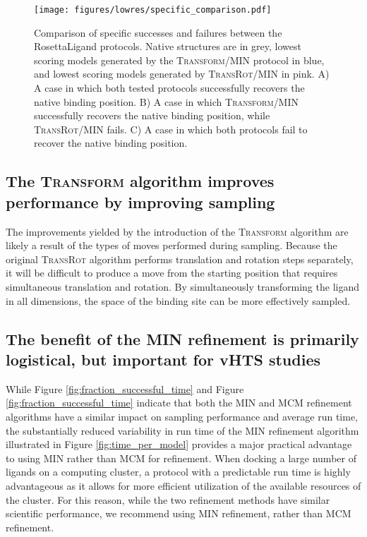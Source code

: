 \begin{figure}
\centering
\texttt{[image: figures/lowres/specific\_comparison.pdf]}
\caption{
Comparison of specific successes and failures between the RosettaLigand protocols.
Native structures are in grey, lowest scoring models generated by the \textsc{Transform}/MIN protocol in blue, and lowest scoring models generated by \textsc{TransRot}/MIN in pink.
A) A case in which both tested protocols successfully recovers the native binding position.
B) A case in which \textsc{Transform}/MIN successfully recovers the native binding position, while \textsc{TransRot}/MIN fails.
C) A case in which both protocols fail to recover the native binding position. 
}
\label{fig:specific_comparison}
\end{figure}

\subsection{The \textsc{Transform} algorithm improves performance by improving sampling}
The improvements yielded by the introduction of the \textsc{Transform} algorithm are likely a result of the types of moves performed during sampling.
Because the original \textsc{TransRot} algorithm performs translation and rotation steps separately, it will be difficult to produce a move from the starting position that requires simultaneous translation and rotation.
By simultaneously transforming the ligand in all dimensions, the space of the binding site can be more effectively sampled. 

\subsection{The benefit of the MIN refinement is primarily logistical, but important for vHTS studies}
While Figure \ref{fig:fraction_successful_time} and Figure \ref{fig:fraction_successful_time} indicate that both the MIN and MCM refinement algorithms have a similar impact on sampling performance and average run time, the substantially reduced variability in run time of the MIN refinement algorithm illustrated in Figure \ref{fig:time_per_model} provides a major practical advantage to using MIN rather than MCM for refinement.
When docking a large number of ligands on a computing cluster, a protocol with a predictable run time is highly advantageous as it allows for more efficient utilization of the available resources of the cluster. 
For this reason, while the two refinement methods have similar scientific performance, we recommend using MIN refinement, rather than MCM refinement. 

